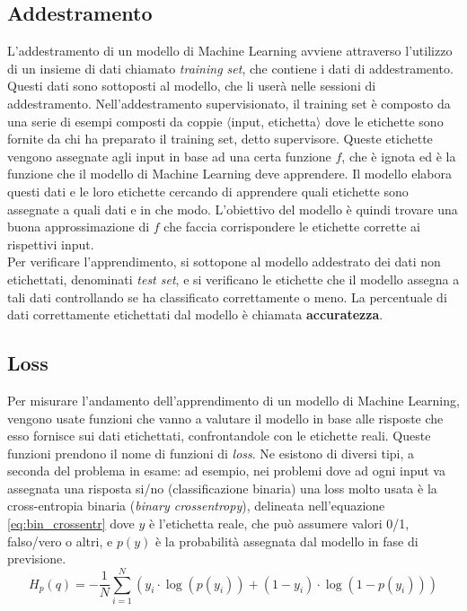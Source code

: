 \subsection{Addestramento} L'addestramento di un modello di Machine Learning avviene attraverso l'utilizzo di un insieme di dati chiamato \textit{training set}, che contiene i dati di addestramento. Questi dati sono sottoposti al modello, che li userà nelle sessioni di addestramento. Nell'addestramento supervisionato, il training set è composto da una serie di esempi composti da coppie $\langle$input, etichetta$\rangle$ dove le etichette sono fornite da chi ha preparato il training set, detto supervisore. Queste etichette vengono assegnate agli input in base ad una certa funzione $f$, che è ignota ed è la funzione che il modello di Machine Learning deve apprendere. Il modello elabora questi dati e le loro etichette cercando di apprendere quali etichette sono assegnate a quali dati e in che modo. L'obiettivo del modello è quindi trovare una buona approssimazione di $f$ che faccia corrispondere le etichette corrette ai rispettivi input.\\
Per verificare l'apprendimento, si sottopone al modello addestrato dei dati non etichettati, denominati \textit{test set}, e si verificano le etichette che il modello assegna a tali dati controllando se ha classificato correttamente o meno. La percentuale di dati correttamente etichettati dal modello è chiamata \textbf{accuratezza}.

\subsection{Loss} Per misurare l'andamento dell'apprendimento di un modello di Machine Learning, vengono usate funzioni che vanno a valutare il modello in base alle risposte che esso fornisce sui dati etichettati, confrontandole con le etichette reali. Queste funzioni prendono il nome di funzioni di \textit{loss}. Ne esistono di diversi tipi, a seconda del problema in esame: ad esempio, nei problemi dove ad ogni input va assegnata una risposta si/no (classificazione binaria) una loss molto usata è la cross-entropia binaria (\textit{binary crossentropy}), delineata nell'equazione \ref{eq:bin_crossentr} dove $y$ è l'etichetta reale, che può assumere valori 0/1, falso/vero o altri, e $p(y)$ è la probabilità assegnata dal modello in fase di previsione.
\begin{equation}\label{eq:bin_crossentr}
H_p(q) = -\frac{1}{N}\sum_{i=1}^N \left(y_i\cdot\log(p(y_i)) + (1 - y_i)\cdot\log(1 - p(y_i))\right)
\end{equation}

